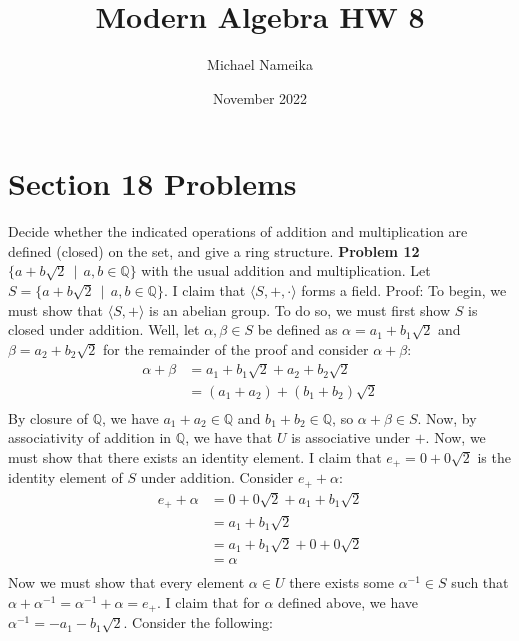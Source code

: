 \documentclass{article}
\title{Modern Algebra HW 8}
\author{Michael Nameika}
\date{November 2022}
\begin{document}
\maketitle

\section*{Section 18 Problems}
Decide whether the indicated operations of addition and multiplication are defined (closed) on the set, and give a ring structure. 
\newline\newline
\textbf{Problem 12} $\{a + b\sqrt{2} \:\: | \:\: a, b \in \mathbb{Q}\}$ with the usual addition and multiplication.
\newline
Let $S = \{a + b\sqrt{2} \:\: | \:\:  a, b \in \mathbb{Q}\}$. I claim that $\langle S, +, \cdot \rangle$ forms a field. 
\newline
Proof: To begin, we must show that $\langle S, + \rangle$ is an abelian group. To do so, we must first show $S$ is closed under addition. Well, let $\alpha, \beta \in S$ be defined as $\alpha = a_1 + b_1\sqrt{2}$ and $\beta = a_2 + b_2\sqrt{2}$ for the remainder of the proof and consider $\alpha + \beta$:
\begin{align*}
    \alpha + \beta &= a_1 + b_1\sqrt{2} + a_2 + b_2\sqrt{2} \\
    &= (a_1 + a_2) + (b_1 + b_2)\sqrt{2} \\
\end{align*}
By closure of $\mathbb{Q}$, we have $a_1 + a_2 \in \mathbb{Q}$ and $b_1 + b_2 \in \mathbb{Q}$, so $\alpha + \beta \in S$. Now, by associativity of addition in $\mathbb{Q}$, we have that $U$ is associative under $+$. Now, we must show that there exists an identity element. I claim that $e_+ = 0 + 0\sqrt{2}$ is the identity element of $S$ under addition. Consider $e_+ + \alpha$:
\begin{align*}
    e_+ + \alpha &= 0 + 0\sqrt{2} + a_1 + b_1\sqrt{2} \\
    &= a_1 + b_1\sqrt{2} \\
    &= a_1 + b_1\sqrt{2} + 0 + 0\sqrt{2} \\
    &= \alpha \\
\end{align*}
Now we must show that every element $\alpha \in U$ there exists some $\alpha^{-1} \in S$ such that $\alpha + \alpha^{-1} = \alpha^{-1} + \alpha = e_+$. I claim that for $\alpha$ defined above, we have $\alpha^{-1} = -a_1 - b_1\sqrt{2}$. Consider the following:
\end{document}
